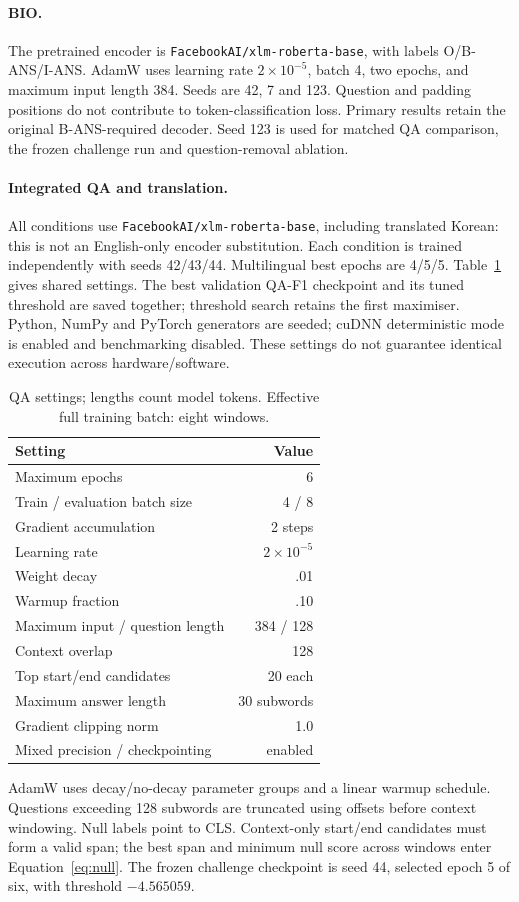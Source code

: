 \documentclass[11pt]{article}
\begin{document}
\paragraph{BIO.}
The pretrained encoder is \texttt{FacebookAI/xlm-roberta-base}, with labels O/B-ANS/I-ANS. AdamW uses learning rate $2\times10^{-5}$, batch 4, two epochs, and maximum input length 384. Seeds are 42, 7 and 123. Question and padding positions do not contribute to token-classification loss. Primary results retain the original B-ANS-required decoder. Seed 123 is used for matched QA comparison, the frozen challenge run and question-removal ablation.

\paragraph{Integrated QA and translation.}
All conditions use \texttt{FacebookAI/xlm-roberta-base}, including translated Korean: this is not an English-only encoder substitution. Each condition is trained independently with seeds 42/43/44. Multilingual best epochs are 4/5/5. Table~\ref{tab:qa-settings} gives shared settings. The best validation QA-F1 checkpoint and its tuned threshold are saved together; threshold search retains the first maximiser. Python, NumPy and PyTorch generators are seeded; cuDNN deterministic mode is enabled and benchmarking disabled. These settings do not guarantee identical execution across hardware/software.

\begin{table}[H]
\centering\small
\begin{tabular}{lr}
\toprule
Setting & Value\\
\midrule
Maximum epochs & 6\\
Train / evaluation batch size & 4 / 8\\
Gradient accumulation & 2 steps\\
Learning rate & $2\times10^{-5}$\\
Weight decay & .01\\
Warmup fraction & .10\\
Maximum input / question length & 384 / 128\\
Context overlap & 128\\
Top start/end candidates & 20 each\\
Maximum answer length & 30 subwords\\
Gradient clipping norm & 1.0\\
Mixed precision / checkpointing & enabled\\
\bottomrule
\end{tabular}
\caption{QA settings; lengths count model tokens. Effective full training batch: eight windows.}
\label{tab:qa-settings}
\end{table}
AdamW uses decay/no-decay parameter groups and a linear warmup schedule. Questions exceeding 128 subwords are truncated using offsets before context windowing. Null labels point to CLS. Context-only start/end candidates must form a valid span; the best span and minimum null score across windows enter Equation~\ref{eq:null}. The frozen challenge checkpoint is seed 44, selected epoch 5 of six, with threshold $-4.565059$.
\end{document}
